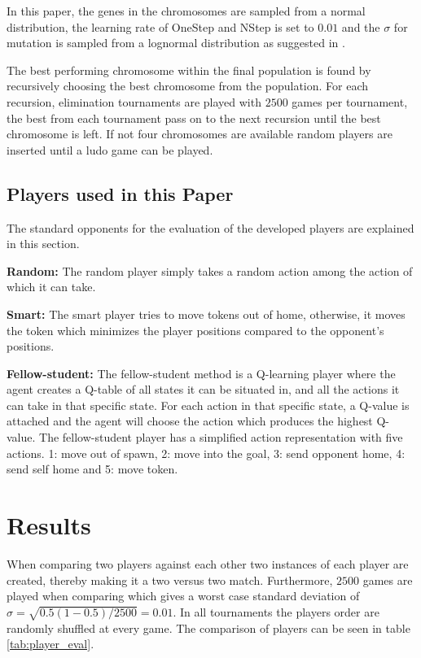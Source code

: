 \documentclass{llncs}
\begin{document}
In this paper, the genes in the chromosomes are sampled from a normal distribution, the learning rate of OneStep and NStep is set to $0.01$ and the $\sigma$ for mutation is sampled from a lognormal distribution as suggested in \cite{ec:springer}.

The best performing chromosome within the final population is found by recursively choosing the best chromosome from the population. For each recursion, elimination tournaments are played with $2500$ games per tournament, the best from each tournament pass on to the next recursion until the best chromosome is left. If not four chromosomes are available random players are inserted until a ludo game can be played.

\subsection{Players used in this Paper}
The standard opponents for the evaluation of the developed players are explained in this section.

\textbf{Random:} The random player simply takes a random action among the action of which it can take.

\textbf{Smart:} The smart player tries to move tokens out of home, otherwise, it moves the token which minimizes the player positions compared to the opponent's positions.

\textbf{Fellow-student:} The fellow-student method \cite{mikkel} is a Q-learning player where the agent creates a Q-table of all states it can be situated in, and all the actions it can take in that specific state. For each action in that specific state, a Q-value is attached and the agent will choose the action which produces the highest Q-value. The fellow-student player has a simplified action representation with five actions. 1: move out of spawn, 2: move into the goal, 3: send opponent home, 4: send self home and 5: move token.

\section{Results} \label{sec:results}
When comparing two players against each other two instances of each player are created, thereby making it a two versus two match. Furthermore, $2500$ games are played when comparing which gives a worst case standard deviation of $\sigma = \sqrt{0.5(1-0.5)/2500}=0.01$. In all tournaments the players order are randomly shuffled at every game. The comparison of players can be seen in table \ref{tab:player_eval}.
\end{document}
